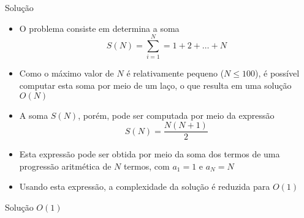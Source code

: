 \begin{frame}[fragile]{Solução}

    \begin{itemize}
        \item O problema consiste em determina a soma
        \[
            S(N) = \sum_{i = 1}^N = 1 + 2 + \ldots + N
        \]
            
        \item Como o máximo valor de $N$ é relativamente pequeno ($N\leq 100$), é possível 
            computar esta soma por meio de um laço, o que resulta em uma solução $O(N)$

        \item A soma $S(N)$, porém, pode ser computada por meio da expressão
        \[
            S(N) = \frac{N(N + 1)}{2}
        \]

        \item Esta expressão pode ser obtida por meio da soma dos termos de uma progressão
            aritmética de $N$ termos, com $a_1 = 1$ e $a_N = N$

        \item Usando esta expressão, a complexidade da solução é reduzida para $O(1)$
    \end{itemize}

\end{frame}

\begin{frame}[fragile]{Solução $O(1)$}
\end{frame}
